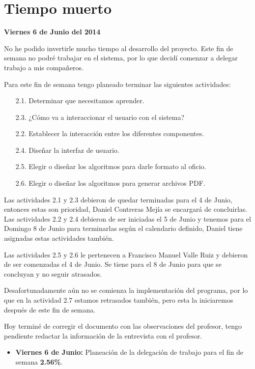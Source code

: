 \documentclass[letterpaper]{article}
\begin{document}
\section{Tiempo muerto}
\textbf{Viernes 6 de Junio del 2014}

No he podido invertirle mucho tiempo al desarrollo del proyecto. Este fin de semana no podré trabajar en el sistema, por lo que decidí comenzar a delegar trabajo a mis compañeros.

Para este fin de semana tengo planeado terminar las siguientes actividades:

\begin{itemize}
\item[2.1.] Determinar que necesitamos aprender.
\item[2.3.] ¿Cómo va a interaccionar el usuario con el sistema?
\item[2.2.] Establecer la interacción entre los diferentes componentes.
\item[2.4.] Diseñar la interfaz de usuario.
\item[2.5.] Elegir o diseñar los algoritmos para darle formato al oficio.
\item[2.6.] Elegir o diseñar los algoritmos para generar archivos PDF.
\end{itemize}

Las actividades 2.1 y 2.3 debieron de quedar terminadas para el 4 de Junio, entonces estas son prioridad, Daniel Contreras Mejía se encargará de concluirlas. Las actividades 2.2 y 2.4 debieron de ser iniciadas el 5 de Junio y tenemos para el Domingo 8 de Junio para terminarlas según el calendario definido, Daniel tiene asignadas estas actividades también.

Las actividades 2.5 y 2.6 le pertenecen a Francisco Manuel Valle Ruiz y debieron de ser comenzadas el 4 de Junio. Se tiene para el 8 de Junio para que se concluyan y no seguir atrasados.

Desafortunadamente aún no se comienza la implementación del programa, por lo que en la actividad 2.7 estamos retrasados también, pero esta la iniciaremos después de este fin de semana.

Hoy terminé de corregir el documento con las observaciones del profesor, tengo pendiente redactar la información de la entrevista con el profesor.

\begin{itemize}
\item \textbf{Viernes 6 de Junio:} Planeación de la delegación de trabajo para el fin de semana \textbf{2.56\%}.
\end{itemize}
\end{document}
